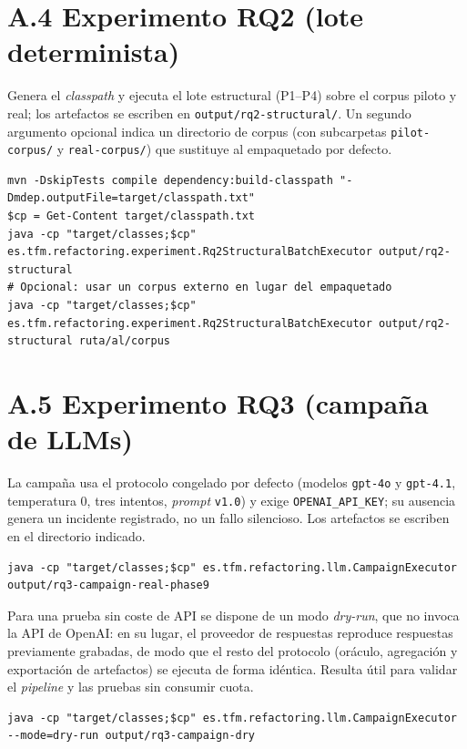 \section*{A.4 Experimento RQ2 (lote determinista)}
Genera el \emph{classpath} y ejecuta el lote estructural (P1--P4) sobre el
corpus piloto y real; los artefactos se escriben en
\texttt{output/rq2-structural/}. Un segundo argumento opcional indica un
directorio de corpus (con subcarpetas \texttt{pilot-corpus/} y
\texttt{real-corpus/}) que sustituye al empaquetado por defecto.
\begin{lstlisting}[language={},basicstyle=\footnotesize\ttfamily]
mvn -DskipTests compile dependency:build-classpath "-Dmdep.outputFile=target/classpath.txt"
$cp = Get-Content target/classpath.txt
java -cp "target/classes;$cp" es.tfm.refactoring.experiment.Rq2StructuralBatchExecutor output/rq2-structural
# Opcional: usar un corpus externo en lugar del empaquetado
java -cp "target/classes;$cp" es.tfm.refactoring.experiment.Rq2StructuralBatchExecutor output/rq2-structural ruta/al/corpus
\end{lstlisting}

\section*{A.5 Experimento RQ3 (campaña de LLMs)}
La campaña usa el protocolo congelado por defecto (modelos \texttt{gpt-4o} y
\texttt{gpt-4.1}, temperatura 0, tres intentos, \emph{prompt} \texttt{v1.0}) y
exige \texttt{OPENAI\_API\_KEY}; su ausencia genera un incidente registrado, no
un fallo silencioso. Los artefactos se escriben en el directorio indicado.
\begin{lstlisting}[language={},basicstyle=\footnotesize\ttfamily]
java -cp "target/classes;$cp" es.tfm.refactoring.llm.CampaignExecutor output/rq3-campaign-real-phase9
\end{lstlisting}
Para una prueba sin coste de API se dispone de un modo \emph{dry-run}, que no
invoca la API de OpenAI: en su lugar, el proveedor de respuestas reproduce
respuestas previamente grabadas, de modo que el resto del protocolo (oráculo,
agregación y exportación de artefactos) se ejecuta de forma idéntica. Resulta
útil para validar el \emph{pipeline} y las pruebas sin consumir cuota.
\begin{lstlisting}[language={},basicstyle=\footnotesize\ttfamily]
java -cp "target/classes;$cp" es.tfm.refactoring.llm.CampaignExecutor --mode=dry-run output/rq3-campaign-dry
\end{lstlisting}

